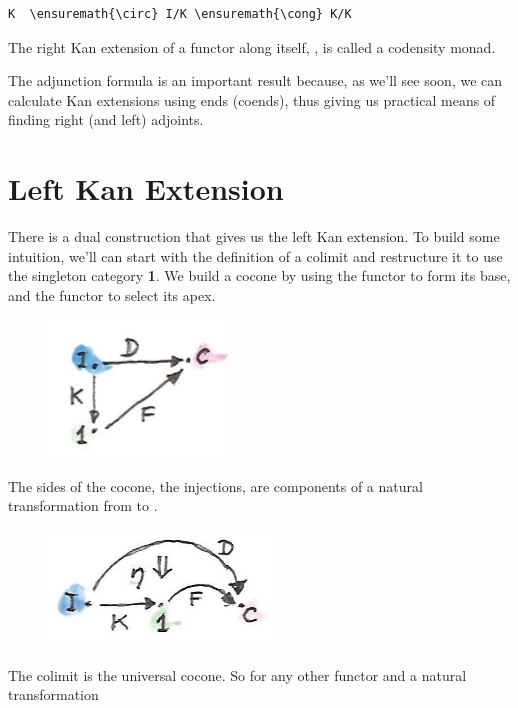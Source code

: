 \begin{Verbatim}[commandchars=\\\{\}]
K  \ensuremath{\circ} I/K \ensuremath{\cong} K/K
\end{Verbatim}
The right Kan extension of a functor along itself, , is
called a codensity monad.

The adjunction formula is an important result because, as we'll see
soon, we can calculate Kan extensions using ends (coends), thus giving
us practical means of finding right (and left) adjoints.

\section{Left Kan Extension}\label{left-kan-extension}

There is a dual construction that gives us the left Kan extension. To
build some intuition, we'll can start with the definition of a colimit
and restructure it to use the singleton category \textbf{1}. We build a
cocone by using the functor  to form its
base, and the functor  to select its apex.

\begin{figure}[H]
\centering
\includegraphics[width=1.90625in]{images/kan81.jpg}
\end{figure}

\noindent
The sides of the cocone, the injections, are components of a natural
transformation  from  to .

\begin{figure}[H]
\centering
\includegraphics[width=2.33333in]{images/kan10a.jpg}
\end{figure}

\noindent
The colimit is the universal cocone. So for any other functor
 and a natural transformation

